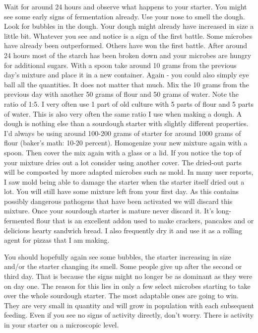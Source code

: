 Wait for around 24 hours and observe what happens to your starter.
You might see some early signs of fermentation already. Use your nose
to smell the dough. Look for bubbles in the dough. Your dough
might already have increased in size a little bit. Whatever
you see and notice is a sign of the first battle. Some microbes
have already been outperformed. Others have won the first battle.
After around 24 hours most of the starch has been broken down
and your microbes are hungry for additional sugars. With a spoon
take around 10 grams from the previous day's mixture and place
it in a new container. Again - you could also simply eye ball
all the quantities. It does not matter that much. Mix the 10
grams from the previous day with another 50 grams of flour
and 50 grams of water. Note the ratio of 1:5. I very often use
1 part of old culture with 5 parts of flour and 5 parts of water.
This is also very often the same ratio I use when making a dough.
A dough is nothing else than a sourdough starter with slightly different
properties. I'd always be using around 100-200 grams of starter
for around 1000 grams of flour (baker's math: 10-20 percent).
Homogenize your new mixture again with a spoon. Then cover
the mix again with a glass or a lid. If you notice the top of
your mixture dries out a lot consider using another cover. The
dried-out parts will be composted by more adapted microbes such as
mold. In many user reports, I saw mold being able to damage
the starter when the starter itself dried out a lot. You will
still have some mixture left from your first day. As this contains
possibly dangerous pathogens that have been activated we will discard
this mixture. Once your sourdough starter is mature never
discard it. It's long-fermented flour that is an excellent addon
used to make crackers, pancakes and or delicious hearty sandwich
bread. I also frequently dry it and use it as a rolling agent
for pizzas that I am making.

You should hopefully again see some bubbles, the starter increasing
in size and/or the starter changing its smell. Some people give
up after the second or third day. That is because the signs might no longer
be as dominant as they were on day one. The reason for this lies in only a few
select microbes starting to take over the whole sourdough starter. The most
adaptable ones are going to win. They are very small in quantity and will
grow in population with each subsequent feeding. Even if you see no signs
of activity directly, don't worry. There is activity in
your starter on a microscopic level.

